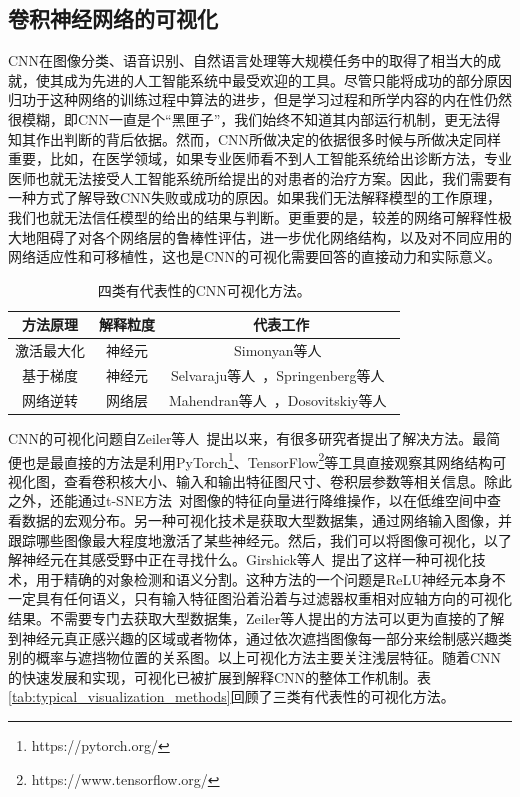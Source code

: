 \subsection{卷积神经网络的可视化}\label{subsec:visulization_methods}
CNN在图像分类、语音识别、自然语言处理等大规模任务中的取得了相当大的成就，使其成为先进的人工智能系统中最受欢迎的工具。尽管只能将成功的部分原因归功于这种网络的训练过程中算法的进步，但是学习过程和所学内容的内在性仍然很模糊，即CNN一直是个“黑匣子”，我们始终不知道其内部运行机制，更无法得知其作出判断的背后依据。然而，CNN所做决定的依据很多时候与所做决定同样重要，比如，在医学领域，如果专业医师看不到人工智能系统给出诊断方法，专业医师也就无法接受人工智能系统所给提出的对患者的治疗方案。因此，我们需要有一种方式了解导致CNN失败或成功的原因。如果我们无法解释模型的工作原理，我们也就无法信任模型的给出的结果与判断。更重要的是，较差的网络可解释性极大地阻碍了对各个网络层的鲁棒性评估，进一步优化网络结构，以及对不同应用的网络适应性和可移植性，这也是CNN的可视化需要回答的直接动力和实际意义。
\begin{table}[h]
	\centering
	\caption[四类有代表性的CNN可视化方法]{四类有代表性的CNN可视化方法。}
	\label{tab:typical_visualization_methods}
	\begin{tabular}{c|c|c}
		\toprule[2pt]
		方法原理 & 解释粒度 & 代表工作 \\ \midrule[2pt]
		激活最大化 & 神经元  & Simonyan等人~\cite{simonyan2013deep}  \\\hline
		基于梯度 &  神经元 & Selvaraju等人~\cite{selvaraju2017grad}，Springenberg等人~\cite{springenberg2014striving} \\  \hline
		网络逆转 & 网络层 &Mahendran等人~\cite{mahendran2015understanding, mahendran2016visualizing}，Dosovitskiy等人~\cite{dosovitskiy2016inverting}\\
		\bottomrule[2pt]
	\end{tabular}
	\label{tab:four_visulization_types}
\end{table}

CNN的可视化问题自Zeiler等人~\cite{zeiler2014visualizing}提出以来，有很多研究者提出了解决方法。最简便也是最直接的方法是利用PyTorch\footnote{https://pytorch.org/}、TensorFlow\footnote{https://www.tensorflow.org/}等工具直接观察其网络结构可视化图，查看卷积核大小、输入和输出特征图尺寸、卷积层参数等相关信息。除此之外，还能通过t-SNE方法~\cite{maaten2008visualizing}对图像的特征向量进行降维操作，以在低维空间中查看数据的宏观分布。另一种可视化技术是获取大型数据集，通过网络输入图像，并跟踪哪些图像最大程度地激活了某些神经元。然后，我们可以将图像可视化，以了解神经元在其感受野中正在寻找什么。Girshick等人~\cite{girshick2014rich}提出了这样一种可视化技术，用于精确的对象检测和语义分割。这种方法的一个问题是ReLU神经元本身不一定具有任何语义，只有输入特征图沿着沿着与过滤器权重相对应轴方向的可视化结果。不需要专门去获取大型数据集，Zeiler等人提出的方法可以更为直接的了解到神经元真正感兴趣的区域或者物体，通过依次遮挡图像每一部分来绘制感兴趣类别的概率与遮挡物位置的关系图。以上可视化方法主要关注浅层特征。随着CNN的快速发展和实现，可视化已被扩展到解释CNN的整体工作机制。表\ref{tab:typical_visualization_methods}回顾了三类有代表性的可视化方法。
